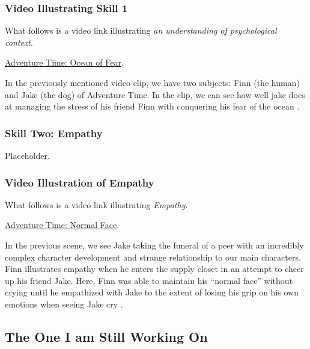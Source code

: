 \documentclass[stu,12pt]{apa7}
\begin{document}
        \subsubsection*{Video Illustrating Skill 1}
          What follows is a video link illustrating \textit{an understanding
            of psychological context}.

          \href{https://www.youtube.com/watch?v=cSSB4qPrfOg}{Adventure Time: %
            Ocean of Fear}.

          In the previously mentioned video clip, we have two subjects: Finn
            (the human) and Jake (the dog) of Adventure Time. In the clip, we
            can see how well jake does at managing the stress of his friend
            Finn with conquering his fear of the ocean
            \parencite[00:00:30--00:01:00]{leichliter_adventure_2017}.


      \subsubsection{Skill Two: Empathy}
        Placeholder.

        \subsubsection*{Video Illustration of Empathy}
          What follows is a video link illustrating \textit{Empathy}.

          \href{https://www.youtube.com/watch?v=AuD_VzYku78}{Adventure Time:
            Normal Face}.

          In the previous scene, we see Jake taking the funeral of a peer with
            an incredibly complex character development and strange relationship
            to our main characters. Finn illustrates empathy when he enters the
            supply closet in an attempt to cheer up his friend Jake. Here,
            Finn was able to maintain his ``normal face'' without crying until
            he empathized with Jake to the extent of losing his grip on his own
            emotions when seeing Jake cry
            \parencite{leichliter_adventure_2015}.


    \subsection{The One I am Still Working On}
\end{document}
